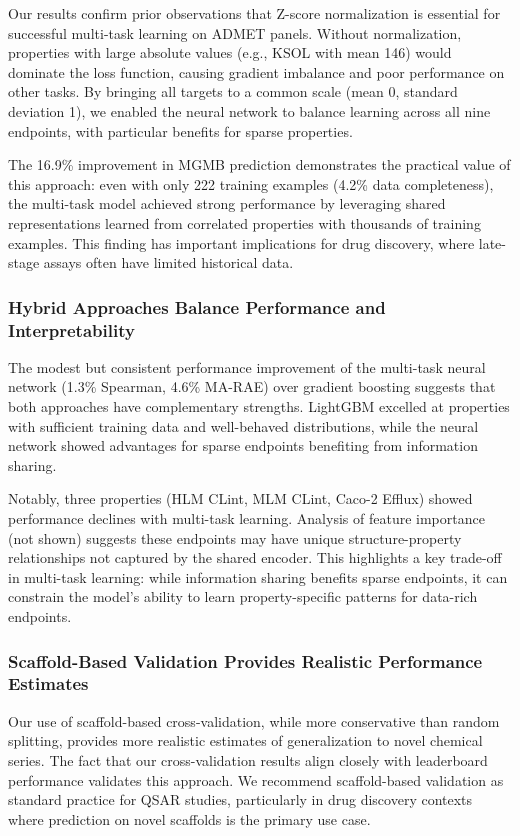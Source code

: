 \documentclass[11pt,a4paper]{article}
\begin{document}
Our results confirm prior observations that Z-score normalization is essential for successful multi-task learning on ADMET panels. Without normalization, properties with large absolute values (e.g., KSOL with mean 146) would dominate the loss function, causing gradient imbalance and poor performance on other tasks. By bringing all targets to a common scale (mean 0, standard deviation 1), we enabled the neural network to balance learning across all nine endpoints, with particular benefits for sparse properties.

The 16.9\% improvement in MGMB prediction demonstrates the practical value of this approach: even with only 222 training examples (4.2\% data completeness), the multi-task model achieved strong performance by leveraging shared representations learned from correlated properties with thousands of training examples. This finding has important implications for drug discovery, where late-stage assays often have limited historical data.

\subsubsection{Hybrid Approaches Balance Performance and Interpretability}

The modest but consistent performance improvement of the multi-task neural network (1.3\% Spearman, 4.6\% MA-RAE) over gradient boosting suggests that both approaches have complementary strengths. LightGBM excelled at properties with sufficient training data and well-behaved distributions, while the neural network showed advantages for sparse endpoints benefiting from information sharing.

Notably, three properties (HLM CLint, MLM CLint, Caco-2 Efflux) showed performance declines with multi-task learning. Analysis of feature importance (not shown) suggests these endpoints may have unique structure-property relationships not captured by the shared encoder. This highlights a key trade-off in multi-task learning: while information sharing benefits sparse endpoints, it can constrain the model's ability to learn property-specific patterns for data-rich endpoints.

\subsubsection{Scaffold-Based Validation Provides Realistic Performance Estimates}

Our use of scaffold-based cross-validation, while more conservative than random splitting, provides more realistic estimates of generalization to novel chemical series. The fact that our cross-validation results align closely with leaderboard performance validates this approach. We recommend scaffold-based validation as standard practice for QSAR studies, particularly in drug discovery contexts where prediction on novel scaffolds is the primary use case.
\end{document}
